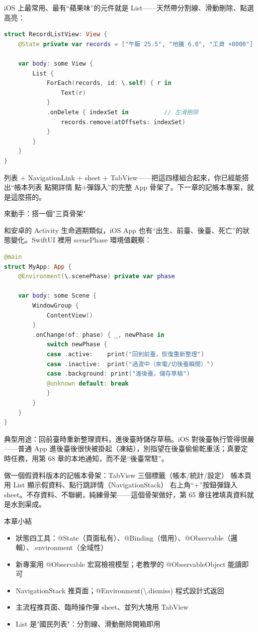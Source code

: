 iOS 上最常用、最有“蘋果味”的元件就是 List——天然帶分割線、滑動刪除、點選高亮：

\begin{lstlisting}[language=Swift]
struct RecordListView: View {
    @State private var records = ["午飯 25.5", "地鐵 6.0", "工資 +8000"]

    var body: some View {
        List {
            ForEach(records, id: \.self) { r in
                Text(r)
            }
            .onDelete { indexSet in          // 左滑刪除
                records.remove(atOffsets: indexSet)
            }
        }
    }
}
\end{lstlisting}

列表 + NavigationLink + sheet + TabView——把這四樣組合起來，你已經能搭出“帳本列表 點開詳情 點+彈錄入”的完整 App 骨架了。下一章的記帳本專案，就是這麼搭的。

\begin{tcbpractice}{來動手：搭一個"三頁骨架"}

和安卓的 Activity 生命週期類似，iOS App 也有“出生、前臺、後臺、死亡”的狀態變化。SwiftUI 裡用 scenePhase 環境值觀察：

\begin{lstlisting}[language=Swift]
@main
struct MyApp: App {
    @Environment(\.scenePhase) private var phase

    var body: some Scene {
        WindowGroup {
            ContentView()
        }
        .onChange(of: phase) { _, newPhase in
            switch newPhase {
            case .active:    print("回到前臺，恢復重新整理")
            case .inactive:  print("過渡中（來電/切後臺瞬間）")
            case .background: print("進後臺，儲存草稿")
            @unknown default: break
            }
        }
    }
}
\end{lstlisting}

典型用途：回前臺時重新整理資料，進後臺時儲存草稿。iOS 對後臺執行管得很嚴——普通 App 進後臺後很快被掛起（凍結），別指望在後臺偷偷乾重活；真要定時任務，用第 68 章的本地通知，而不是“後臺常駐”。

做一個假資料版本的記帳本骨架：TabView 三個標籤（帳本/統計/設定） 帳本頁用 List 顯示假資料、點行跳詳情（NavigationStack） 右上角“+”按鈕彈錄入 sheet。不存資料、不聯網，純練骨架——這個骨架做好，第 65 章往裡填真資料就是水到渠成。

\end{tcbpractice}

\begin{tcbsummary}{本章小結}
\begin{itemize}
  \item 狀態四工具：@State（頁面私有）、@Binding（借用）、@Observable（邏輯）、.environment（全域性）
  \item 新專案用 @Observable 宏寫檢視模型；老教學的 @ObservableObject 能讀即可
  \item NavigationStack 推頁面；@Environment(\textbackslash{}.dismiss) 程式設計式返回
  \item 主流程推頁面、臨時操作彈 sheet、並列大塊用 TabView
  \item List 是"國民列表"：分割線、滑動刪除開箱即用
\end{itemize}

\end{tcbsummary}
